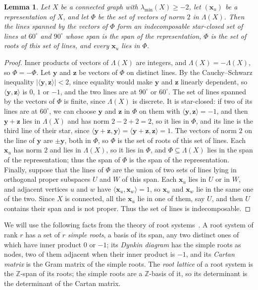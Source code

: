 \documentclass[11pt]{article}
\newcommand\ints{{\mathbb Z}}
\newcommand\Zy{{\mathbf y}}
\newcommand\Zz{{\mathbf z}}
\newcommand\Zx{{\mathbf x}}
\newcommand\sbs{\subseteq}
\newcommand\ip[2]{\langle#1,#2\rangle}
\newtheorem{lemma}[theorem]{Lemma}
\theoremstyle{definition}
\newcommand{\lmin}{\lambda_{\min}}
\begin{document}
\begin{lemma}\label{lem:latticeroots}
Let $X$ be a connected graph with $\lmin(X)\ge-2$, let $(\Zx_u)$ be a representation of $X$, and
let $\Phi$ be the set of vectors of norm $2$ in $\Lambda(X)$. Then the lines spanned by the
vectors of $\Phi$ form an indecomposable star-closed set of lines at $60^\circ$ and $90^\circ$
whose span is the span of the representation, $\Phi$ is the set of roots of this set of lines,
and every $\Zx_u$ lies in $\Phi$.
\end{lemma}

\begin{proof}
Inner products of vectors of $\Lambda(X)$ are integers, and $\Lambda(X)=-\Lambda(X)$, so
$\Phi=-\Phi$. Let $\Zy$ and $\Zz$ be vectors of $\Phi$ on distinct lines. By the Cauchy--Schwarz
inequality $|\ip{\Zy}{\Zz}|<2$, since equality would make $\Zy$ and $\Zz$ linearly dependent,
so $\ip{\Zy}{\Zz}$ is $0$, $1$ or $-1$, and the two lines are at $90^\circ$ or $60^\circ$. The
set of lines spanned by the vectors of $\Phi$ is finite, since $\Lambda(X)$ is discrete. It is
star-closed: if two of its lines are at $60^\circ$, we can choose $\Zy$ and $\Zz$ in $\Phi$ on
them with $\ip{\Zy}{\Zz}=-1$, and then $\Zy+\Zz$ lies in $\Lambda(X)$ and has norm $2-2+2=2$, so
it lies in $\Phi$, and its line is the third line of their star, since
$\ip{\Zy+\Zz}{\Zy}=\ip{\Zy+\Zz}{\Zz}=1$. The vectors of norm $2$ on the line of $\Zy$ are
$\pm\Zy$, both in $\Phi$, so $\Phi$ is the set of roots of this set of lines. Each $\Zx_u$ has
norm $2$ and lies in $\Lambda(X)$, so it lies in $\Phi$, and $\Phi\sbs\Lambda(X)$ lies in the span
of the representation; thus the span of $\Phi$ is the span of the representation. Finally,
suppose that the lines of $\Phi$ are the union of two sets of lines lying in orthogonal proper
subspaces $U$ and $W$ of this span. Each $\Zx_u$ lies in $U$ or in $W$, and adjacent vertices
$u$ and $w$ have $\ip{\Zx_u}{\Zx_w}=1$, so $\Zx_u$ and $\Zx_w$ lie in the same one of the two.
Since $X$ is connected, all the $\Zx_u$ lie in one of them, say $U$, and then $U$ contains their
span and is not proper. Thus the set of lines is indecomposable.
\end{proof}

We will use the following facts from the theory of root systems~\cite[Chapter~III]{Hum72}. A root
system of rank $r$ has a set of $r$ \textsl{simple roots}, a basis of its span, any two distinct
ones of which have inner product $0$ or $-1$; its \textsl{Dynkin diagram} has the simple roots as
nodes, two of them adjacent when their inner product is $-1$, and its \textsl{Cartan matrix} is
the Gram matrix of the simple roots. The \textsl{root lattice} of a root system is the
$\ints$-span of its roots; the simple roots are a $\ints$-basis of it, so its determinant is the
determinant of the Cartan matrix.
\end{document}
